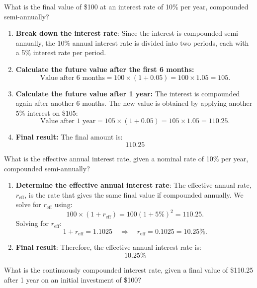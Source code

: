 \begin{example}
    What is the final value of \$100 at an interest rate of 10\% per year, compounded semi-annually?

    \begin{enumerate}
        \item \textbf{Break down the interest rate}: 
        Since the interest is compounded semi-annually, the 10\% annual interest rate is divided into two periods, each with a 5\% interest rate per period. 
        
        \item \textbf{Calculate the future value after the first 6 months:} 
        \[
        \text{Value after 6 months} = 100 \times (1 + 0.05) = 100 \times 1.05 = 105.
        \]
        
        \item \textbf{Calculate the future value after 1 year:} 
        The interest is compounded again after another 6 months. The new value is obtained by applying another 5\% interest on \$105:
        \[
        \text{Value after 1 year} = 105 \times (1 + 0.05) = 105 \times 1.05 = 110.25.
        \]
        
        \item \textbf{Final result:} 
        The final amount is:
        \[
        \boxed{110.25}
        \]
    \end{enumerate}

    What is the effective annual interest rate, given a nominal rate of 10\% per year, compounded semi-annually?

    \begin{enumerate}        
        \item \textbf{Determine the effective annual interest rate}: 
        The effective annual rate, \( r_{\text{eff}} \), is the rate that gives the same final value if compounded annually. We solve for \( r_{\text{eff}} \) using:
        \[
        100 \times (1 + r_{\text{eff}}) = 100(1+5\%)^2 = 110.25.
        \]
        Solving for \( r_{\text{eff}} \):
        \[
        1 + r_{\text{eff}} = 1.1025 \quad \Rightarrow \quad r_{\text{eff}} = 0.1025 = 10.25\%.
        \]
        
        \item \textbf{Final result}: 
        Therefore, the effective annual interest rate is:
        \[
        \boxed{10.25\%}
        \]
    \end{enumerate}

    What is the continuously compounded interest rate, given a final value of \$110.25 after 1 year on an initial investment of \$100?


\end{example}
